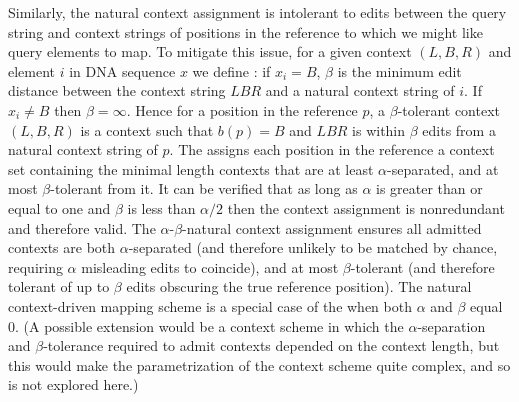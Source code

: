 Similarly, the natural context assignment is intolerant to edits between the query string and context strings of positions in the reference to which we might like query elements to map. To mitigate this issue, for a given context $(L,B,R)$ and element $i$ in DNA sequence $x$ we define : if $x_i = B$, $\beta$ is the minimum edit distance between the context string $LBR$ and a natural context string of $i$. If $x_i \not= B$ then $\beta=\infty$. 
Hence for a position in the reference $p$, a $\beta$-tolerant context $(L, B, R)$ is a context such that $b(p) = B$ and $LBR$ is within $\beta$ edits from a natural context string of $p$. 
The  assigns each position in the reference a context set containing the minimal length contexts that are at least $\alpha$-separated, and at most $\beta$-tolerant from it. 
It can be verified that as long as $\alpha$ is greater than or equal to one and $\beta$ is less than $\alpha/2$ then the context assignment is nonredundant and therefore valid.
The $\alpha$-$\beta$-natural context assignment ensures all admitted contexts are both $\alpha$-separated (and therefore unlikely to be matched by chance, requiring $\alpha$ misleading edits to coincide), and at most $\beta$-tolerant (and therefore tolerant of up to $\beta$ edits obscuring the true reference position). The natural context-driven mapping scheme is a special case of the  when both $\alpha$ and $\beta$ equal 0. (A possible extension would be a context scheme in which the $\alpha$-separation and $\beta$-tolerance required to admit contexts depended on the context length, but this would make the parametrization of the context scheme quite complex, and so is not explored here.)


